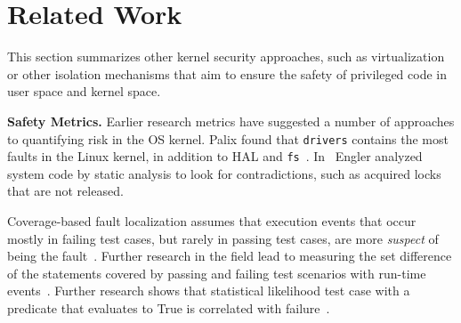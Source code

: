 \section{Related Work}
\label{sec.related_work}
This section summarizes other kernel security approaches, such as virtualization
 or other isolation mechanisms
that aim to ensure the safety of privileged code in user space and kernel space.


\textbf{Safety Metrics.}
Earlier research metrics have suggested a number
of approaches to quantifying risk in the OS kernel.
Palix found that \texttt{drivers} contains the
most faults in the Linux kernel, in addition to HAL and \texttt{fs}~\cite{palix2011faults}.
In~\cite{engler2001bugs} Engler analyzed system code by static analysis
to look for contradictions, such as acquired locks that are
not released.



Coverage-based fault localization assumes that execution events that occur mostly in failing
test cases, but rarely in passing test cases, are more \textit{suspect}
of being the fault~\cite{jones2002visualization}. Further research in the field lead to measuring the set
difference of the statements covered by passing and failing test scenarios with run-time events~\cite{agrawal1995fault, jones2005empirical}.
Further research shows that statistical likelihood test case with a predicate that evaluates to True
is correlated with failure~\cite{liblit2005scalable}.



